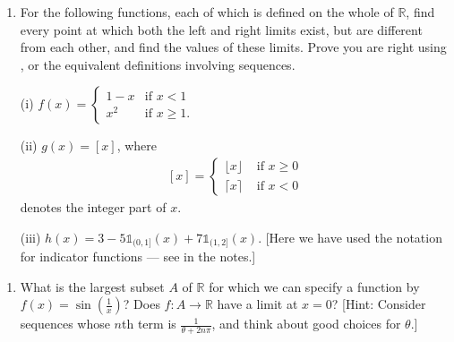 \documentclass[letterpaper,10pt,english]{jupyterBook}
\begin{document}
\label{\detokenize{Problems:id8}}\begin{enumerate}
%
\setcounter{enumi}{7}
\item {} 
\sphinxAtStartPar
{} For the following functions, each of which is defined on the whole of \(\mathbb{R}\), find every point at which both the left and right limits exist, but are different from each other, and find the values of these limits. 
Prove you are right using , or the equivalent definitions involving sequences.

\sphinxAtStartPar
(i) \(f(x) = \begin{cases} 1 -x & \text{if }x < 1\\ x^{2}& \text{if }x \geq 1. \end{cases}\)

\sphinxAtStartPar
(ii) \(g(x) = [x]\), where
\begin{equation}\label{equation:Problems:eq:[x]}
\begin{split}[x] = \left\{\begin{array}{cl} \lfloor x\rfloor & \text{ if } x\geq 0 \\ \lceil x \rceil & \text{ if } x<0 \end{array}\right.\end{split}
\end{equation}
\sphinxAtStartPar
denotes the integer part of \(x\).

\sphinxAtStartPar
(iii) \(h(x) =3 - 5\mathbb{1}_{(0, 1]}(x) + 7\mathbb{1}_{(1, 2]}(x)\). {[}Here we have used the notation for indicator functions — see  in the notes.{]}

\end{enumerate}
\label{\detokenize{Problems:id9}}\begin{enumerate}
%
\setcounter{enumi}{8}
\item {} 
\sphinxAtStartPar
{} What is the largest subset \(A\) of \(\mathbb{R}\) for which we can specify a function by \(f(x) = \sin\left(\frac{1}{x}\right)\)? Does \(f:A\to\mathbb{R}\) have a limit at \(x = 0\)? {[}Hint: Consider sequences whose \(n\)th term is \(\frac{1}{\theta + 2n\pi}\), and think about good choices for \(\theta\).{]}

\end{enumerate}
\end{document}
